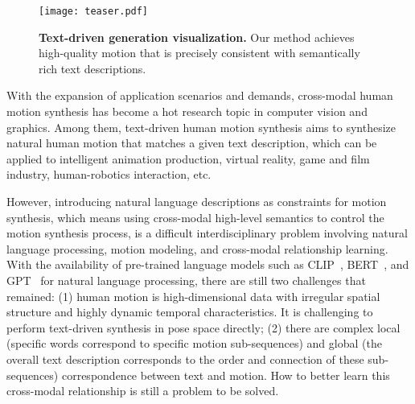 \documentclass[10pt,twocolumn,letterpaper]{article}
\begin{document}
\begin{figure}[t]
    \centering
    \texttt{[image: teaser.pdf]}
    \caption{\textbf{Text-driven generation visualization.} Our method achieves high-quality motion that is precisely consistent with semantically rich text descriptions. }
    \label{img:01}
    \vspace{-10pt}
\end{figure}

With the expansion of application scenarios and demands, cross-modal human motion synthesis has become a hot research topic in computer vision and graphics. Among them, text-driven human motion synthesis aims to synthesize natural human motion that matches a given text description, which can be applied to intelligent animation production, virtual reality, game and film industry, human-robotics interaction, etc.

However, introducing natural language descriptions as constraints for motion synthesis, which means using cross-modal high-level semantics to control the motion synthesis process, is a difficult interdisciplinary problem involving natural language processing, motion modeling, and cross-modal relationship learning. With the availability of pre-trained language models such as CLIP~\cite{radford2021learning}, BERT~\cite{devlin2018bert}, and GPT~\cite{radford2018improving} for natural language processing, there are still two challenges that remained: (1) human motion is high-dimensional data with irregular spatial structure and highly dynamic temporal characteristics. It is challenging to perform text-driven synthesis in pose space directly; (2) there are complex local (specific words correspond to specific motion sub-sequences) and global (the overall text description corresponds to the order and connection of these sub-sequences) correspondence between text and motion. How to better learn this cross-modal relationship is still a problem to be solved.
\end{document}
